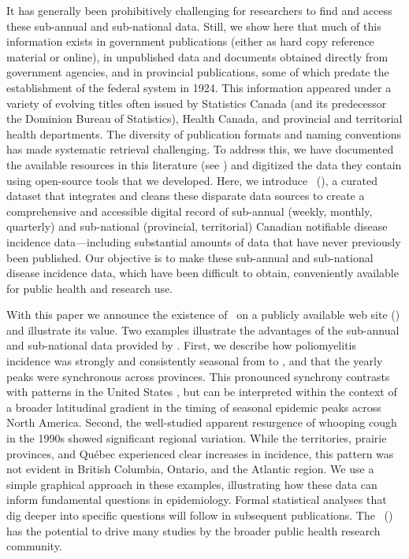 \documentclass[12pt]{article}
\begin{document}
It has generally been prohibitively challenging for researchers to find and access these sub-annual and sub-national data. Still, we show here that much of this information exists in government publications (either as hard copy reference material or online), in unpublished data and documents obtained directly from government agencies, and in provincial publications, some of which predate the establishment of the federal system in 1924. This information appeared under a variety of evolving titles often issued by Statistics Canada (and its predecessor the Dominion Bureau of Statistics), Health Canada, and provincial and territorial health departments. The diversity of publication formats and naming conventions has made systematic retrieval challenging. To address this, we have documented the available resources in this literature (see ) and digitized the data they contain using open-source tools that we developed. Here, we introduce \datacronym\ (\datname), a curated dataset that integrates and cleans these disparate data sources to create a comprehensive and accessible digital record of sub-annual (weekly, monthly, quarterly) and sub-national (provincial, territorial) Canadian notifiable disease incidence data---including substantial amounts of data that have never previously been published. Our objective is to make these sub-annual and sub-national disease incidence data, which have been difficult to obtain, conveniently available for public health and research use.

With this paper we announce the existence of \datacronym\ on a publicly available web site () and illustrate its value. Two examples illustrate the advantages of the sub-annual and sub-national data provided by \datacronym. First, we describe how poliomyelitis incidence was strongly and consistently seasonal from  to , and that the yearly peaks were synchronous across provinces. This pronounced synchrony contrasts with patterns in the United States \cite{martinez2015unraveling}, but can be interpreted within the context of a broader latitudinal gradient in the timing of seasonal epidemic peaks across North America. Second, the well-studied apparent resurgence of whooping cough in the 1990s showed significant regional variation. While the territories, prairie provinces, and Qu\'ebec experienced clear increases in incidence, this pattern was not evident in British Columbia, Ontario, and the Atlantic region. We use a simple graphical approach in these examples, illustrating how these data can inform fundamental questions in epidemiology. Formal statistical analyses that dig deeper into specific questions will follow in subsequent publications. The \datname\ (\datacronym) has the potential to drive many studies by the broader public health research community.
\end{document}
